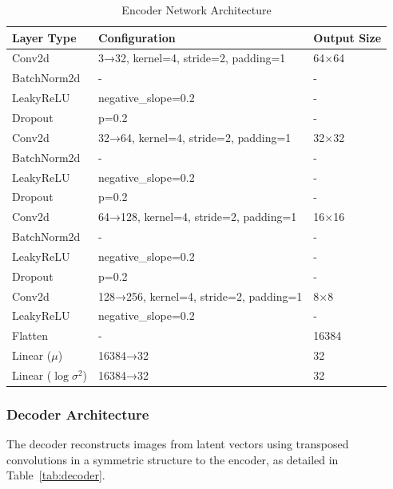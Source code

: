 \documentclass[conference]{IEEEtran}
\begin{document}
\begin{table}[t]
\centering
\caption{Encoder Network Architecture}
\label{tab:encoder}
\begin{tabular}{@{}lll@{}}
\toprule
\textbf{Layer Type} & \textbf{Configuration} & \textbf{Output Size} \\
\midrule
Conv2d & 3→32, kernel=4, stride=2, padding=1 & 64×64 \\
BatchNorm2d & - & - \\
LeakyReLU & negative\_slope=0.2 & - \\
Dropout & p=0.2 & - \\
Conv2d & 32→64, kernel=4, stride=2, padding=1 & 32×32 \\
BatchNorm2d & - & - \\
LeakyReLU & negative\_slope=0.2 & - \\
Dropout & p=0.2 & - \\
Conv2d & 64→128, kernel=4, stride=2, padding=1 & 16×16 \\
BatchNorm2d & - & - \\
LeakyReLU & negative\_slope=0.2 & - \\
Dropout & p=0.2 & - \\
Conv2d & 128→256, kernel=4, stride=2, padding=1 & 8×8 \\
LeakyReLU & negative\_slope=0.2 & - \\
Flatten & - & 16384 \\
Linear ($\mu$) & 16384→32 & 32 \\
Linear ($\log \sigma^2$) & 16384→32 & 32 \\
\bottomrule
\end{tabular}
\end{table}

\subsubsection{Decoder Architecture}

The decoder reconstructs images from latent vectors using transposed convolutions in a symmetric structure to the encoder, as detailed in Table~\ref{tab:decoder}.
\end{document}
